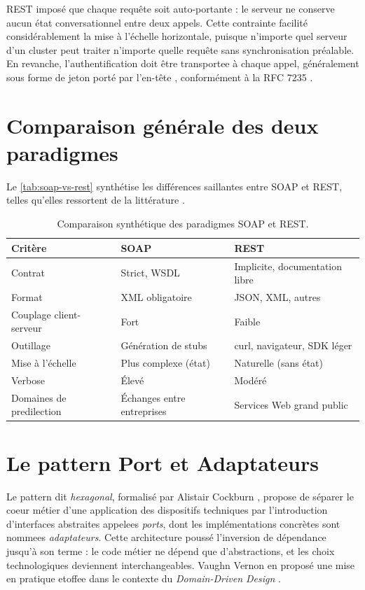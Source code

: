 REST imposé que chaque requête soit auto-portante : le serveur ne conserve aucun état conversationnel entre deux appels. Cette contrainte facilité considérablement la mise à l'échelle horizontale, puisque n'importe quel serveur d'un cluster peut traiter n'importe quelle requête sans synchronisation préalable. En revanche, l'authentification doit être transportee à chaque appel, généralement sous forme de jeton porté par l'en-tête , conformément à la RFC 7235 \citep{rfc7235}.

\section{Comparaison générale des deux paradigmes}

Le \autoref{tab:soap-vs-rest} synthétise les différences saillantes entre SOAP et REST, telles qu'elles ressortent de la littérature \citep{richardson2007, newman2021}.

\begin{table}[ht]
  \centering
  \caption{Comparaison synthétique des paradigmes SOAP et REST.}
  \label{tab:soap-vs-rest}
  \begin{tabularx}{\linewidth}{l X X}
    \toprule
    \textbf{Critère} & \textbf{SOAP} & \textbf{REST} \\
    \midrule
    Contrat & Strict, WSDL & Implicite, documentation libre \\
    Format & XML obligatoire & JSON, XML, autres \\
    Couplage client-serveur & Fort & Faible \\
    Outillage & Génération de stubs & curl, navigateur, SDK léger \\
    Mise à l'échelle & Plus complexe (état) & Naturelle (sans état) \\
    Verbose & Élevé & Modéré \\
    Domaines de predilection & Échanges entre entreprises & Services Web grand public \\
    \bottomrule
  \end{tabularx}
\end{table}

\section{Le pattern Port et Adaptateurs}

Le pattern dit \emph{hexagonal}, formalisé par Alistair Cockburn \citep{cockburn2005}, propose de séparer le coeur métier d'une application des dispositifs techniques par l'introduction d'interfaces abstraites appelees \emph{ports}, dont les implémentations concrètes sont nommees \emph{adaptateurs}. Cette architecture poussé l'inversion de dépendance jusqu'à son terme : le code métier ne dépend que d'abstractions, et les choix technologiques deviennent interchangeables. Vaughn Vernon en proposé une mise en pratique etoffee dans le contexte du \emph{Domain-Driven Design} \citep{vernon2013}.


